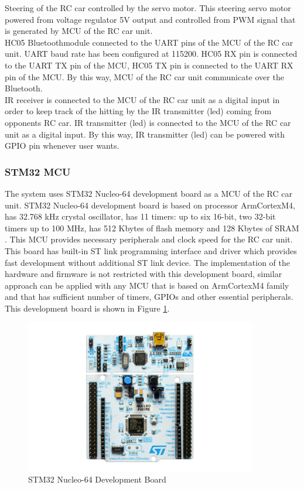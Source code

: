 Steering of the RC car controlled by the servo motor. This steering servo motor powered from voltage regulator 5V output and controlled from PWM signal that is generated by MCU of the RC car unit. \\

HC05 Bluetooth\texttrademark\;module connected to the UART pins of the MCU of the RC car unit. UART baud rate has been configured at 115200. HC05 RX pin is connected to the UART TX pin of the MCU, HC05 TX pin is connected to the UART RX pin of the MCU. By this way, MCU of the RC car unit communicate over the Bluetooth\texttrademark. \\

IR receiver is connected to the MCU of the RC car unit as a digital input in order to keep track of the hitting by the IR transmitter (led) coming from opponents RC car. IR transmitter (led) is connected to the MCU of the RC car unit as a digital input. By this way, IR transmitter (led) can be powered with GPIO pin whenever user wants.


\subsubsection{STM32 MCU}
The system uses STM32 Nucleo-64 development board as a MCU of the RC car unit. STM32 Nucleo-64 development board is based on processor Arm\textregistered\;Cortex\textregistered\;M4, has 32.768 kHz crystal oscillator,  has 11 timers: up to six 16-bit, two 32-bit timers up to 100 MHz, has 512 Kbytes of flash memory and 128 Kbytes of SRAM \cite{One}. This MCU provides necessary peripherals and clock speed for the RC car unit. This board has built-in ST link programming interface and driver which provides fast development without additional ST link device. The implementation of the hardware and firmware is not restricted with this development board, similar approach can be applied with any MCU that is based on Arm\textregistered\;Cortex\textregistered\;M4 family and that has sufficient number of timers, GPIOs and other essential peripherals. This development board is shown in Figure \ref{fig:nucleo64_board}.\\

\begin{figure}[!htbp]
    \centering
    \includegraphics[width=0.9\textwidth]{Imgs/nucleo64.jpg}
    \caption{\label{fig:nucleo64_board}STM32 Nucleo-64 Development Board \cite{One}}
\end{figure}

